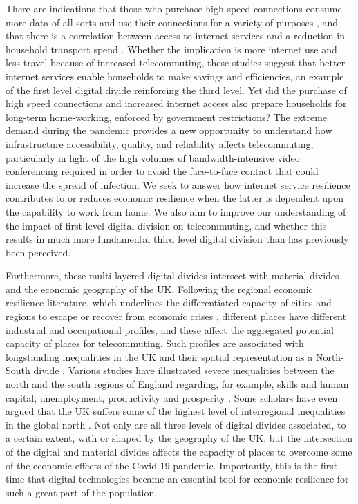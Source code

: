 \documentclass[Royal,times,sageh]{sagej}
\begin{document}
There are indications that those who purchase high speed connections
consume more data of all sorts and use their connections for a variety
of purposes \citep{hauge2011consumer}, and that there is a correlation
between access to internet services and a reduction in household
transport spend \citep{bris2017ict}. Whether the implication is more
internet use and less travel because of increased telecommuting, these
studies suggest that better internet services enable households to make
savings and efficiencies, an example of the first level digital divide
reinforcing the third level. Yet did the purchase of high speed
connections and increased internet access also prepare households for
long-term home-working, enforced by government restrictions? The extreme
demand during the pandemic provides a new opportunity to understand how
infrastructure accessibility, quality, and reliability affects
telecommuting, particularly in light of the high volumes of
bandwidth-intensive video conferencing required in order to avoid the
face-to-face contact that could increase the spread of infection. We
seek to answer how internet service resilience contributes to or reduces
economic resilience when the latter is dependent upon the capability to
work from home. We also aim to improve our understanding of the impact
of first level digital division on telecommuting, and whether this
results in much more fundamental third level digital division than has
previously been perceived.

Furthermore, these multi-layered digital divides intersect with material
divides and the economic geography of the UK. Following the regional
economic resilience literature, which underlines the differentiated
capacity of cities and regions to escape or recover from economic crises
\citep{martin2012regional, kitsos2018economic}, different places have
different industrial and occupational profiles, and these affect the
aggregated potential capacity of places for telecommuting. Such profiles
are associated with longstanding inequalities in the UK and their
spatial representation as a North-South divide
\citep{martin_north_south}. Various studies have illustrated severe
inequalities between the north and the south regions of England
regarding, for example, skills and human capital, unemployment,
productivity and prosperity
\citep{lee2014grim, mccann2020perceptions, dorling2018peak}. Some
scholars have even argued that the UK suffers some of the highest level
of interregional inequalities in the global north
\citep{gal2018reducing, mccann2016uk}. Not only are all three levels of
digital divides associated, to a certain extent, with or shaped by the
geography of the UK, but the intersection of the digital and material
divides affects the capacity of places to overcome some of the economic
effects of the Covid-19 pandemic. Importantly, this is the first time
that digital technologies became an essential tool for economic
resilience for such a great part of the population.
\end{document}
